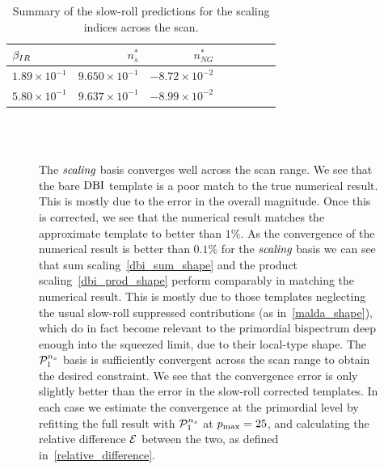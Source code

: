 \begin{table}[h!]
  \begin{center}
    \begin{tabular}{lrrrrrrr}
        \toprule
        $\beta_{IR}$ &  $n_s^{*}$ &  $n_{NG}^{*}$\\
        \midrule
        $1.89\times 10^{-1}$  &  $9.650\times 10^{-1}$  &  $-8.72\times 10^{-2}$\\
        $5.80\times 10^{-1}$  &  $9.637\times 10^{-1}$  &  $-8.99\times 10^{-2}$\\
        \bottomrule
    \end{tabular}
      \caption{
          Summary of the slow-roll predictions for the scaling indices across the scan.
      }\label{tab:scan_summary_ns}
  \end{center}
\end{table}


\begin{figure}[htbp!]
\centering
    \\
    \\
\caption{
    The $\textit{scaling}$ basis converges well across the scan range.
    We see that the bare $\text{DBI}$ template is a poor match to the true numerical result.
    This is mostly due to the error in the overall magnitude.
    Once this is corrected, we see that the numerical result matches the
    approximate template to better than $1\%$. As the convergence of the
    numerical result is better than $0.1\%$ for the $\textit{scaling}$ basis
    we can see that sum scaling~\eqref{dbi_sum_shape} and the
    product scaling~\eqref{dbi_prod_shape} perform
    comparably in matching the numerical result. This is mostly
    due to those templates neglecting the usual slow-roll suppressed
    contributions (as in~\eqref{malda_shape}),
    which do in fact become relevant to the primordial
    bispectrum deep enough into the squeezed limit, due to their local-type shape.
    The $\mathcal{P}^{n_s}_1$ basis is sufficiently convergent across the scan range
    to obtain the desired constraint.
    We see that the convergence error is only slightly better than the error
    in the slow-roll corrected templates.
    In each case we estimate the convergence at the primordial level
    by refitting the full result with $\mathcal{P}^{n_s}_1$ at $p_\text{max}=25$, and calculating
    the relative difference $\mathcal{E}$ between the two,
    as defined in~\eqref{relative_difference}.
}\label{fig:prim_conv}
\end{figure}

